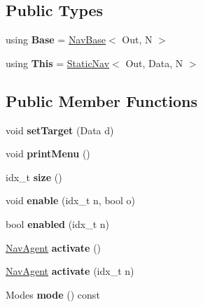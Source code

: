 \subsection*{Public Types}
\begin{DoxyCompactItemize}
\item 
\mbox{\label{classStaticNav_ab2ae6346fddbb5950059933ef9012b01}} 
using {\bfseries Base} = \hyperlink{classNavBase}{Nav\+Base}$<$ Out, N $>$
\item 
\mbox{\label{classStaticNav_a0d189566b3180f3813f10b1a002e21a3}} 
using {\bfseries This} = \hyperlink{classStaticNav}{Static\+Nav}$<$ Out, Data, N $>$
\end{DoxyCompactItemize}
\subsection*{Public Member Functions}
\begin{DoxyCompactItemize}
\item 
\mbox{\label{classStaticNav_aa8cff1184d567261a965fd156ffdea0f}} 
void {\bfseries set\+Target} (Data d)
\item 
\mbox{\label{classStaticNav_a91d58be31f193e1597297e3c0ad21075}} 
void {\bfseries print\+Menu} ()
\item 
\mbox{\label{classStaticNav_acb2ba41d545d2a85e85a99eee29fc997}} 
idx\+\_\+t {\bfseries size} ()
\item 
\mbox{\label{classStaticNav_a5351ff6e5c461ba17d58e61f50afdc7e}} 
void {\bfseries enable} (idx\+\_\+t n, bool o)
\item 
\mbox{\label{classStaticNav_a91d588d2e25e30cdcfe67d4f1193f728}} 
bool {\bfseries enabled} (idx\+\_\+t n)
\item 
\mbox{\label{classStaticNav_a7f60ebff6754ffdc19b41efdb653e82f}} 
\hyperlink{structNavAgent}{Nav\+Agent} {\bfseries activate} ()
\item 
\mbox{\label{classStaticNav_a398534802c57a6161a7a350db96473ee}} 
\hyperlink{structNavAgent}{Nav\+Agent} {\bfseries activate} (idx\+\_\+t n)
\item 
\mbox{\label{classStaticNav_afde4f7e0edf90c177da0aeb0800d1646}} 
Modes {\bfseries mode} () const
\end{DoxyCompactItemize}
